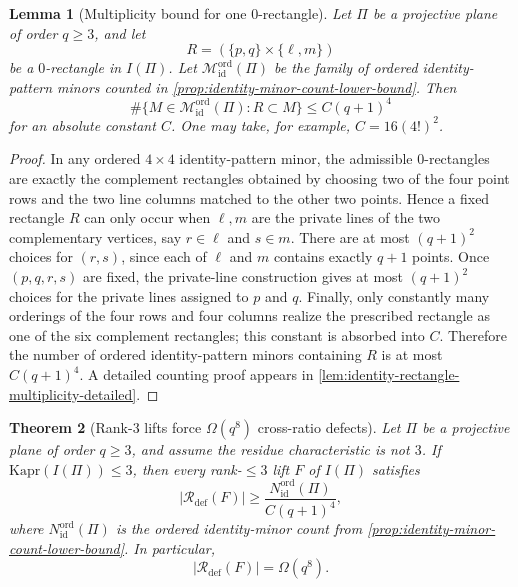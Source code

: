 \documentclass[11pt]{amsart}
\numberwithin{equation}{section}
\theoremstyle{plain}
\newtheorem{theorem}{Theorem}[section]
\newtheorem{lemma}[theorem]{Lemma}
\theoremstyle{definition}
\theoremstyle{remark}
\newcommand{\Kapr}{\mathrm{Kapr}}
\begin{document}
\begin{lemma}[Multiplicity bound for one $0$-rectangle]
\label{lem:identity-rectangle-multiplicity}
Let $\Pi$ be a projective plane of order $q\ge 3$, and let
\[
R=(\{p,q\}\times \{\ell,m\})
\]
be a $0$-rectangle in $I(\Pi)$.
Let $\mathcal M_{\mathrm{id}}^{\mathrm{ord}}(\Pi)$ be the family of ordered identity-pattern minors counted in \cref{prop:identity-minor-count-lower-bound}.
Then
\[
\#\{M\in \mathcal M_{\mathrm{id}}^{\mathrm{ord}}(\Pi):R\subset M\}
\le C(q+1)^4
\tag{5.1}
\]
for an absolute constant $C$.
One may take, for example, $C=16(4!)^2$.
\end{lemma}

\begin{proof}
In any ordered $4\times4$ identity-pattern minor, the admissible $0$-rectangles are exactly the complement rectangles obtained by choosing two of the four point rows and the two line columns matched to the other two points. Hence a fixed rectangle $R$ can only occur when $\ell,m$ are the private lines of the two complementary vertices, say $r\in \ell$ and $s\in m$.
There are at most $(q+1)^2$ choices for $(r,s)$, since each of $\ell$ and $m$ contains exactly $q+1$ points.
Once $(p,q,r,s)$ are fixed, the private-line construction gives at most $(q+1)^2$ choices for the private lines assigned to $p$ and $q$.
Finally, only constantly many orderings of the four rows and four columns realize the prescribed rectangle as one of the six complement rectangles; this constant is absorbed into $C$.
Therefore the number of ordered identity-pattern minors containing $R$ is at most $C(q+1)^4$.
A detailed counting proof appears in \cref{lem:identity-rectangle-multiplicity-detailed}.
\end{proof}

\begin{theorem}[Rank-$3$ lifts force $\Omega(q^8)$ cross-ratio defects]
\label{thm:identity-global-curvature-pressure}
Let $\Pi$ be a projective plane of order $q\ge 3$, and assume the residue characteristic is not $3$.
If $\Kapr(I(\Pi))\le 3$, then every rank-$\le 3$ lift $F$ of $I(\Pi)$ satisfies
\[
|\mathcal R_{\mathrm{def}}(F)|
\ge
\frac{N_{\mathrm{id}}^{\mathrm{ord}}(\Pi)}{C(q+1)^4},
\tag{5.2}
\]
where $N_{\mathrm{id}}^{\mathrm{ord}}(\Pi)$ is the ordered identity-minor count from \cref{prop:identity-minor-count-lower-bound}.
In particular,
\[
|\mathcal R_{\mathrm{def}}(F)|=\Omega(q^8).
\]
\end{theorem}
\end{document}
